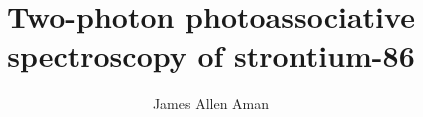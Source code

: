 \documentclass[12pt]{ruthesis}
\title{Two-photon photoassociative spectroscopy of strontium-86}
\author{James Allen Aman}
\begin{document}
  \begin{frontmatter}
  \pagestyle{frontmatterStyle}
   \maketitle
   
   
   
   
   \tableofcontents
   \listoffigures
   \listoftables
  \end{frontmatter}
  













\begin{appendices}





%
%
%
%
%

%
\end{appendices}
\end{document}
